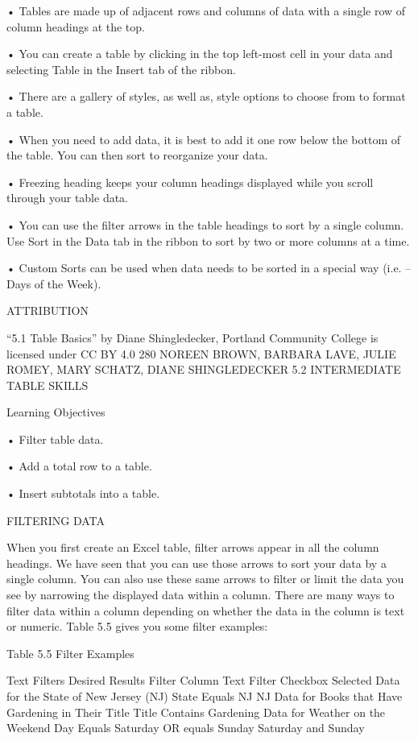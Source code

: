 • Tables are made up of adjacent rows and columns of data with a single row of column headings at the top.

• You can create a table by clicking in the top left-most cell in your data and selecting Table in the Insert tab of
the ribbon.

• There are a gallery of styles, as well as, style options to choose from to format a table.

• When you need to add data, it is best to add it one row below the bottom of the table. You can then sort to
reorganize your data.

• Freezing heading keeps your column headings displayed while you scroll through your table data.

• You can use the filter arrows in the table headings to sort by a single column. Use Sort in the Data tab in the
ribbon to sort by two or more columns at a time.

• Custom Sorts can be used when data needs to be sorted in a special way (i.e. – Days of the Week).



ATTRIBUTION

“5.1 Table Basics” by Diane Shingledecker, Portland Community College is licensed under CC BY 4.0
280 NOREEN BROWN, BARBARA LAVE, JULIE ROMEY, MARY SCHATZ, DIANE SHINGLEDECKER
5.2 INTERMEDIATE TABLE SKILLS




Learning Objectives


• Filter table data.

• Add a total row to a table.

• Insert subtotals into a table.



FILTERING DATA

When you first create an Excel table, filter arrows appear in all the column headings. We have seen
that you can use those arrows to sort your data by a single column. You can also use these same arrows
to filter or limit the data you see by narrowing the displayed data within a column. There are many
ways to filter data within a column depending on whether the data in the column is text or numeric.
Table 5.5 gives you some filter examples:

Table 5.5 Filter Examples

Text Filters
Desired Results                                     Filter Column Text Filter                         Checkbox Selected
Data for the State of New Jersey (NJ)               State            Equals NJ                        NJ
Data for Books that Have Gardening in Their Title Title              Contains Gardening
Data for Weather on the Weekend                     Day              Equals Saturday OR equals Sunday Saturday and Sunday




